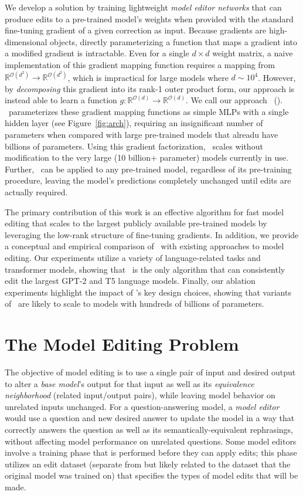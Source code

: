 \documentclass{article}
\begin{document}
We develop a solution by training lightweight \textit{model editor networks} that can produce edits to a pre-trained model's weights when provided with the standard fine-tuning gradient of a given correction as input. Because gradients are high-dimensional objects, directly parameterizing a function that maps a gradient into a modified gradient is intractable. Even for a single $d \times d$ weight matrix, a naive implementation of this gradient mapping function requires a mapping from $\mathbb{R}^{\mathcal{O}(d^2)} \rightarrow \mathbb{R}^{\mathcal{O}(d^2)}$, which is impractical for large models where $d\sim10^4$. However, by \textit{decomposing} this gradient into its rank-1 outer product form, our approach is instead able to learn a function $g:\mathbb{R}^{\mathcal{O}(d)} \rightarrow \mathbb{R}^{\mathcal{O}(d)}$. We call our approach \fullname~(\name). \name~parameterizes these gradient mapping functions as simple MLPs with a single hidden layer (see Figure~\ref{fig:arch}), requiring an insignificant number of parameters when compared with large pre-trained models that alreadu have billions of parameters. Using this gradient factorization, \name~scales without modification to the very large (10 billion+ parameter) models currently in use. Further, \name~can be applied to any pre-trained model, regardless of its pre-training procedure, leaving the model's predictions completely unchanged until edits are actually required.

The primary contribution of this work is an effective algorithm for fast model editing that scales to the largest publicly available pre-trained models by leveraging the low-rank structure of fine-tuning gradients. In addition, we provide a conceptual and empirical comparison of \name~with existing approaches to model editing. Our experiments utilize a variety of language-related tasks and transformer models, showing that \name~is the only algorithm that can consistently edit the largest GPT-2 \citep{radford2019language} and T5 \citep{2020t5} language models. Finally, our ablation experiments highlight the impact of \name's key design choices, showing that variants of \name~are likely to scale to models with hundreds of billions of parameters.


\section{The Model Editing Problem}
The objective of model editing is to use a single pair of input and desired output to alter a \textit{base model}'s output for that input as well as its \textit{equivalence neighborhood} (related input/output pairs), while leaving model behavior on unrelated inputs unchanged. For a question-answering model, a \textit{model editor} would use a question and new desired answer to update the model in a way that correctly answers the question as well as its semantically-equivalent rephrasings, without affecting model performance on unrelated questions. Some model editors involve a training phase that is performed before they can apply edits; this phase utilizes an edit dataset (separate from but likely related to the dataset that the original model was trained on) that specifies the types of model edits that will be made.
\end{document}
